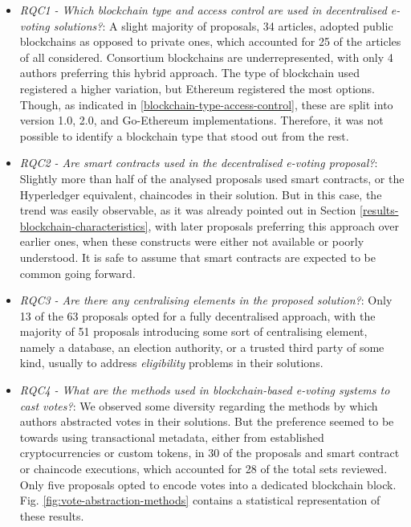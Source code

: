\documentclass[../access.tex]{subfiles}
\begin{document}
\begin{itemize}
    \item {\emph{RQC1 - Which blockchain type and access control are used in decentralised e-voting solutions?}: A slight majority of proposals, 34 articles, adopted public blockchains as opposed to private ones, which accounted for 25 of the articles of all considered. Consortium blockchains are underrepresented, with only 4 authors preferring this hybrid approach. The type of blockchain used registered a higher variation, but Ethereum registered the most options. Though, as indicated in \ref{blockchain-type-access-control}, these are split into version 1.0, 2.0, and Go-Ethereum implementations. Therefore, it was not possible to identify a blockchain type that stood out from the rest.}
    \item {\emph{RQC2 - Are smart contracts used in the decentralised e-voting proposal?}: Slightly more than half of the analysed proposals used smart contracts, or the Hyperledger equivalent, chaincodes in their solution. But in this case, the trend was easily observable, as it was already pointed out in Section \ref{results-blockchain-characteristics}, with later proposals preferring this approach over earlier ones, when these constructs were either not available or poorly understood. It is safe to assume that smart contracts are expected to be common going forward.}
    \item {\emph{RQC3 - Are there any centralising elements in the proposed solution?}: Only 13 of the 63 proposals opted for a fully decentralised approach, with the majority of 51 proposals introducing some sort of centralising element, namely a database, an election authority, or a trusted third party of some kind, usually to address \textit{eligibility} problems in their solutions.}
    \item {\emph{RQC4 - What are the methods used in blockchain-based e-voting systems to cast votes?}: We observed some diversity regarding the methods by which authors abstracted votes in their solutions. But the preference seemed to be towards using transactional metadata, either from established cryptocurrencies or custom tokens, in 30 of the proposals and smart contract or chaincode executions, which accounted for 28 of the total sets reviewed. Only five proposals opted to encode votes into a dedicated blockchain block.
          Fig. \ref{fig:vote-abstraction-methods} contains a statistical representation of these results.}
\end{itemize}
\end{document}
